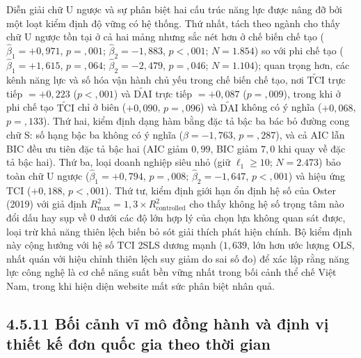 \documentclass[
  a4paper,
  13pt]{extreport}
\begin{document}
Diễn giải chữ U ngược và sự phân biệt hai cấu trúc năng lực được nâng đỡ
bởi một loạt kiểm định độ vững có hệ thống. Thứ nhất, tách theo ngành
cho thấy chữ U ngược tồn tại ở cả hai mảng nhưng sắc nét hơn ở chế biến
chế tạo (\(\hat{\beta}_1 = +0{,}971\), \(p = {,}001\);
\(\hat{\beta}_2 = -1{,}883\), \(p < {,}001\); \(N = 1.854\)) so với phi
chế tạo (\(\hat{\beta}_1 = +1{,}615\), \(p = {,}064\);
\(\hat{\beta}_2 = -2{,}479\), \(p = {,}046\); \(N = 1.104\)); quan trọng
hơn, các kênh năng lực và số hóa vận hành chủ yếu trong chế biến chế
tạo, nơi \(\tilde{\mathrm{TCI}}\) trực tiếp \(= +0{,}223\)
(\(p < {,}001\)) và \(\tilde{\mathrm{DAI}}\) trực tiếp \(= +0{,}087\)
(\(p = {,}009\)), trong khi ở phi chế tạo \(\tilde{\mathrm{TCI}}\) chỉ ở
biên (\(+0{,}090\), \(p = {,}096\)) và \(\tilde{\mathrm{DAI}}\) không có
ý nghĩa (\(+0{,}068\), \(p = {,}133\)). Thứ hai, kiểm định dạng hàm bằng
đặc tả bậc ba bác bỏ đường cong chữ S: số hạng bậc ba không có ý nghĩa
(\(\hat{\beta} = -1{,}763\), \(p = {,}287\)), và cả AIC lẫn BIC đều ưu
tiên đặc tả bậc hai (AIC giảm \(0{,}99\), BIC giảm \(7{,}0\) khi quay về
đặc tả bậc hai). Thứ ba, loại doanh nghiệp siêu nhỏ (giữ
\(\ell_1 \geq 10\); \(N = 2.473\)) bảo toàn chữ U ngược
(\(\hat{\beta}_1 = +0{,}794\), \(p = {,}008\);
\(\hat{\beta}_2 = -1{,}647\), \(p < {,}001\)) và hiệu ứng TCI
(\(+0{,}188\), \(p < {,}001\)). Thứ tư, kiểm định giới hạn ổn định hệ số
của Oster (2019) với giả định
\(R^2_{\max} = 1{,}3 \times R^2_{\text{controlled}}\) cho thấy không hệ
số trọng tâm nào đổi dấu hay sụp về 0 dưới các độ lớn hợp lý của chọn
lựa không quan sát được, loại trừ khả năng thiên lệch biến bỏ sót giải
thích phát hiện chính. Bộ kiểm định này cộng hưởng với hệ số TCI 2SLS
dương mạnh (\(1{,}639\), lớn hơn ước lượng OLS, nhất quán với hiệu chỉnh
thiên lệch suy giảm do sai số đo) để xác lập rằng năng lực công nghệ là
cơ chế năng suất bền vững nhất trong bối cảnh thể chế Việt Nam, trong
khi hiện diện website mất sức phân biệt nhân quả.

\hypertarget{bux1ed1i-cux1ea3nh-vux129-muxf4-ux111ux1ed3ng-huxe0nh-vuxe0-ux111ux1ecbnh-vux1ecb-thiux1ebft-kux1ebf-ux111ux1a1n-quux1ed1c-gia-theo-thux1eddi-gian}{%
\subsection{4.5.11 Bối cảnh vĩ mô đồng hành và định vị thiết kế đơn quốc
gia theo thời
gian}\label{bux1ed1i-cux1ea3nh-vux129-muxf4-ux111ux1ed3ng-huxe0nh-vuxe0-ux111ux1ecbnh-vux1ecb-thiux1ebft-kux1ebf-ux111ux1a1n-quux1ed1c-gia-theo-thux1eddi-gian}}
\end{document}
